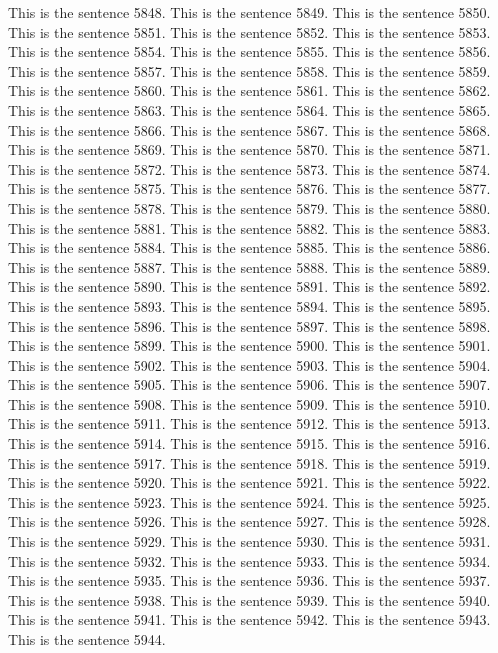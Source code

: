 \documentclass{article}
\begin{document}
This is the sentence 5848.
This is the sentence 5849.
This is the sentence 5850.
This is the sentence 5851.
This is the sentence 5852.
This is the sentence 5853.
This is the sentence 5854.
This is the sentence 5855.
This is the sentence 5856.
This is the sentence 5857.
This is the sentence 5858.
This is the sentence 5859.
This is the sentence 5860.
This is the sentence 5861.
This is the sentence 5862.
This is the sentence 5863.
This is the sentence 5864.
This is the sentence 5865.
This is the sentence 5866.
This is the sentence 5867.
This is the sentence 5868.
This is the sentence 5869.
This is the sentence 5870.
This is the sentence 5871.
This is the sentence 5872.
This is the sentence 5873.
This is the sentence 5874.
This is the sentence 5875.
This is the sentence 5876.
This is the sentence 5877.
This is the sentence 5878.
This is the sentence 5879.
This is the sentence 5880.
This is the sentence 5881.
This is the sentence 5882.
This is the sentence 5883.
This is the sentence 5884.
This is the sentence 5885.
This is the sentence 5886.
This is the sentence 5887.
This is the sentence 5888.
This is the sentence 5889.
This is the sentence 5890.
This is the sentence 5891.
This is the sentence 5892.
This is the sentence 5893.
This is the sentence 5894.
This is the sentence 5895.
This is the sentence 5896.
This is the sentence 5897.
This is the sentence 5898.
This is the sentence 5899.
This is the sentence 5900.
This is the sentence 5901.
This is the sentence 5902.
This is the sentence 5903.
This is the sentence 5904.
This is the sentence 5905.
This is the sentence 5906.
This is the sentence 5907.
This is the sentence 5908.
This is the sentence 5909.
This is the sentence 5910.
This is the sentence 5911.
This is the sentence 5912.
This is the sentence 5913.
This is the sentence 5914.
This is the sentence 5915.
This is the sentence 5916.
This is the sentence 5917.
This is the sentence 5918.
This is the sentence 5919.
This is the sentence 5920.
This is the sentence 5921.
This is the sentence 5922.
This is the sentence 5923.
This is the sentence 5924.
This is the sentence 5925.
This is the sentence 5926.
This is the sentence 5927.
This is the sentence 5928.
This is the sentence 5929.
This is the sentence 5930.
This is the sentence 5931.
This is the sentence 5932.
This is the sentence 5933.
This is the sentence 5934.
This is the sentence 5935.
This is the sentence 5936.
This is the sentence 5937.
This is the sentence 5938.
This is the sentence 5939.
This is the sentence 5940.
This is the sentence 5941.
This is the sentence 5942.
This is the sentence 5943.
This is the sentence 5944.
\end{document}
